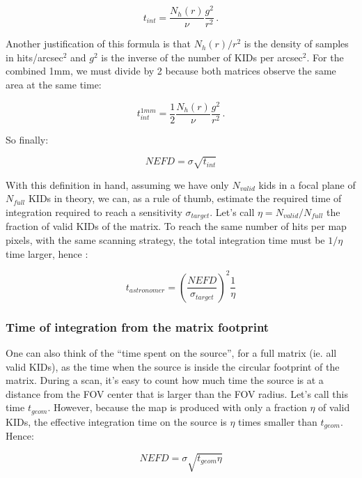 \begin{equation}
t_{int} = \frac{N_h(r)}{\nu}\frac{g^2}{r^2}\,.
\label{eq:t_int}
\end{equation}

Another justification of this formula is that $N_h(r)/r^2$ is the density of
samples in hits/arcsec$^2$ and $g^2$ is the inverse of the number of KIDs per
arcsec$^2$. For the combined 1mm, we must divide by 2 because both matrices
observe the same area at the same time:

\begin{equation}
t^{1mm}_{int} = \frac{1}{2}\frac{N_h(r)}{\nu}\frac{g^2}{r^2}\,.
\label{eq:t_int_1mm}
\end{equation}

So finally:

\begin{equation}
NEFD = \sigma \sqrt{t_{int}}
\label{eq:nefd_t_int}
\end{equation}

With this definition in hand, assuming we have only $N_{valid}$ kids in a focal
plane of $N_{full}$ KIDs in theory, we can, as a rule of thumb, estimate
the required time of integration required to reach a sensitivity
$\sigma_{target}$. Let's call $\eta = N_{valid}/N_{full}$ the fraction of valid
KIDs of the matrix. To reach the same number of hits per map pixels, with the
same scanning strategy, the total integration time must be $1/\eta$ time larger,
hence : 

\begin{equation}
t_{astronomer} = \left(\frac{NEFD}{\sigma_{target}}\right)^2\frac{1}{\eta}
\label{eq:t_astro}
\end{equation}

\subsubsection{Time of integration from the matrix footprint}

One can also think of the ``time spent on the source'', for a full matrix
(ie. all valid KIDs), as the time when the source is inside the circular
footprint of the matrix. During a scan, it's easy to count how much time the
source is at a distance from the FOV center that is larger than the FOV
radius. Let's call this time $t_{geom}$. However, because the map is produced
with only a fraction $\eta$ of valid KIDs, the effective integration time on the
source is $\eta$ times smaller than $t_{geom}$. Hence:

\begin{equation}
NEFD = \sigma \sqrt{t_{geom}\eta}
\label{eq:nefd_t_geom}
\end{equation}


